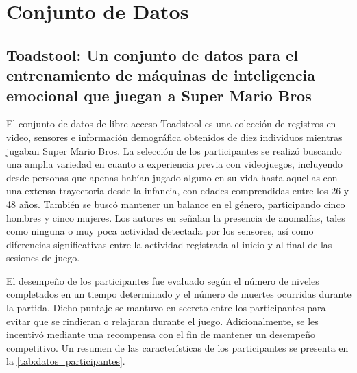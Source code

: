 \section{Conjunto de Datos}

\subsection{Toadstool: Un conjunto de datos para el entrenamiento de máquinas de inteligencia emocional que juegan a Super Mario Bros}

El conjunto de datos de libre acceso Toadstool es una colección de registros en video, sensores e información demográfica obtenidos de diez individuos mientras jugaban Super Mario Bros. La selección de los participantes se realizó buscando una amplia variedad en cuanto a experiencia previa con videojuegos, incluyendo desde personas que apenas habían jugado alguno en su vida hasta aquellas con una extensa trayectoria desde la infancia, con edades comprendidas entre los 26 y 48 años. También se buscó mantener un balance en el género, participando cinco hombres y cinco mujeres. Los autores en \cite{toadstool} señalan la presencia de anomalías, tales como ninguna o muy poca actividad detectada por los sensores, así como diferencias significativas entre la actividad registrada al inicio y al final de las sesiones de juego.

El desempeño de los participantes fue evaluado según el número de niveles completados en un tiempo determinado y el número de muertes ocurridas durante la partida. Dicho puntaje se mantuvo en secreto entre los participantes para evitar que se rindieran o relajaran durante el juego. Adicionalmente, se les incentivó mediante una recompensa con el fin de mantener un desempeño competitivo. Un resumen de las características de los participantes se presenta en la \cref{tab:datos_participantes}.



